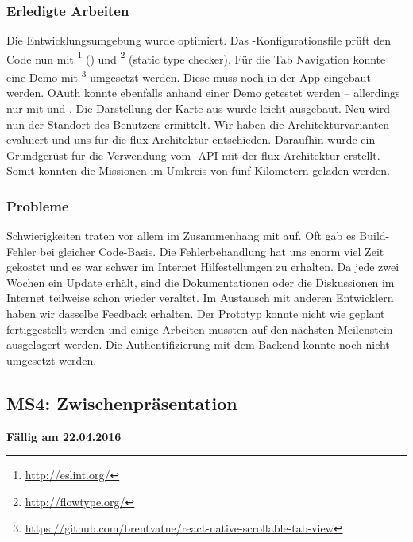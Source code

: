 \subsubsection{Erledigte Arbeiten}
Die Entwicklungsumgebung wurde optimiert. Das -Konfigurationsfile prüft den Code nun mit \footnote{\url{http://eslint.org/}} () und \footnote{\url{http://flowtype.org/}} (static type checker).\newline
Für die Tab Navigation konnte eine Demo mit \footnote{\url{https://github.com/brentvatne/react-native-scrollable-tab-view}} umgesetzt werden. Diese muss noch in der \kort{} App eingebaut werden.\newline
\gls{OAuth} konnte ebenfalls anhand einer Demo getestet werden – allerdings nur mit  und .\newline
Die Darstellung der Karte aus  wurde leicht ausgebaut. Neu wird nun der Standort des Benutzers ermittelt.
Wir haben die Architekturvarianten evaluiert und uns für die flux-Architektur entschieden.
Daraufhin wurde ein Grundgerüst für die Verwendung vom \kort{}-API mit der flux-Architektur erstellt. 
Somit konnten die Missionen im Umkreis von fünf Kilometern geladen werden.

\subsubsection{Probleme}
Schwierigkeiten traten vor allem im Zusammenhang mit  auf.
Oft gab es Build-Fehler bei gleicher Code-Basis.
Die Fehlerbehandlung hat uns enorm viel Zeit gekostet und es war schwer im Internet Hilfestellungen zu erhalten.
Da  jede zwei Wochen ein Update erhält, sind die Dokumentationen oder die Diskussionen im Internet teilweise schon wieder veraltet.\newline
Im Austausch mit anderen  Entwicklern haben wir dasselbe Feedback erhalten.\newline
Der Prototyp konnte nicht wie geplant fertiggestellt werden und einige Arbeiten mussten auf den nächsten Meilenstein ausgelagert werden.
Die Authentifizierung mit dem Backend konnte noch nicht umgesetzt werden.

\subsection{MS4: Zwischenpräsentation}
\label{pm-ms4}
\textbf{Fällig am 22.04.2016}
